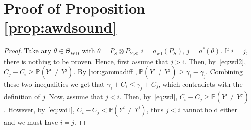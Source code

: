 \documentclass[11pt]{article} %
\newcommand{\WD}{\mathrm{WD}}
\newcommand{\TWD}{\Theta_{\WD}}
\newcommand{\awd}{a_{\mathrm{wd}}}
\newcommand{\Prob}[1]{\mathbb{P}\left(#1\right)}
\begin{document}
\section*{Proof of Proposition \ref{prop:awdsound}}
\begin{proof}
	Take any $\theta\in \TWD$ with $\theta = P_S\otimes P_{Y|S}$, $i = \awd(P_S)$, $j = a^*(\theta)$.
	If $i=j$, there is nothing to be proven. Hence, first assume that $j>i$. Then, by~\eqref{eq:wd2}, $C_j - C_i \ge \Prob{Y^i \ne Y^j}$.
	By \cref{cor:gammadiff}, $\Prob{Y^i \ne Y^j } \ge \gamma_i - \gamma_j$. Combining these two inequalities we get that
	$\gamma_i + C_i \le \gamma_j + C_j$, which contradicts with the definition of $j$.
	Now, assume that $j<i$. Then, by~\eqref{eq:wd}, $C_i - C_j \ge \Prob{Y^i \ne Y^j}$.
	However, by~\eqref{eq:wd1}, $C_i -C_j < \Prob{Y^i \ne Y^j}$, thus $j<i$ cannot hold either and we must have $i=j$.
	\end{proof}
\end{document}
